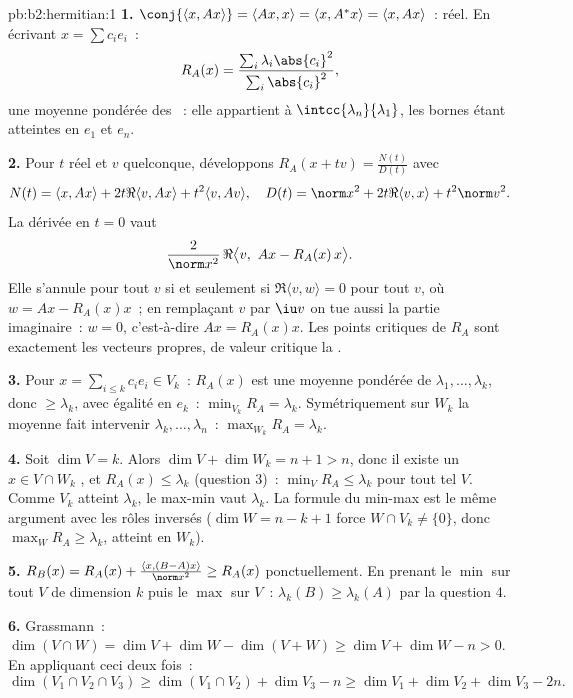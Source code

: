 \begin{solution}{pb:b2:hermitian:1}
\textbf{1.} $\conj{\langle x, Ax\rangle} = \langle Ax, x\rangle
= \langle x, A^*x\rangle = \langle x, Ax\rangle$~: réel. En écrivant
$x = \sum c_ie_i$~:
\[
R_A(x) = \frac{\sum_i\lambda_i\abs{c_i}^2}
{\sum_i\abs{c_i}^2} ,
\]
une moyenne pondérée des ~: elle appartient à
$\intcc{\lambda_n}{\lambda_1}$, les bornes étant atteintes en
$e_1$ et $e_n$.

\textbf{2.} Pour $t$ réel et $v$ quelconque, développons $R_A(x + tv) =
\frac{N(t)}{D(t)}$ avec
\[
N(t) = \langle x, Ax\rangle + 2t\Re\langle v, Ax\rangle +
t^2\langle v, Av\rangle,
\quad
D(t) = \norm x^2 + 2t\Re\langle v, x\rangle + t^2\norm v^2 .
\]
La dérivée en $t = 0$ vaut
\[
\frac{2}{\norm x^2}\,
\Re\bigl\langle v,\ Ax - R_A(x)\,x\bigr\rangle .
\]
Elle s'annule pour tout $v$ si et seulement si $\Re\langle v, w\rangle = 0$ pour
tout $v$, où $w = Ax - R_A(x)x$~; en remplaçant $v$ par $\iu v$
on tue aussi la partie imaginaire~: $w = 0$, c'est-à-dire $Ax = R_A(x)x$.
Les points critiques de $R_A$ sont exactement les vecteurs propres, de
valeur critique la .

\textbf{3.} Pour $x = \sum_{i\leq k}c_ie_i \in V_k$~: $R_A(x)$ est
une moyenne pondérée de $\lambda_1, \dots, \lambda_k$, donc
$\geq \lambda_k$, avec égalité en $e_k$~: $\min_{V_k} R_A =
\lambda_k$. Symétriquement sur $W_k$ la moyenne fait intervenir
$\lambda_k, \dots, \lambda_n$~: $\max_{W_k}R_A = \lambda_k$.

\textbf{4.} Soit $\dim V = k$. Alors $\dim V + \dim W_k = n + 1 >
n$, donc il existe un $x \in V \cap W_k$ , et $R_A(x) \leq
\lambda_k$ (question 3)~: $\min_{V}R_A \leq \lambda_k$ pour tout
tel $V$. Comme $V_k$ atteint $\lambda_k$, le max-min vaut
$\lambda_k$. La formule du min-max est le même argument avec les
rôles inversés ($\dim W = n - k + 1$ force $W \cap V_k \neq
\{0\}$, donc $\max_W R_A \geq \lambda_k$, atteint en $W_k$).

\textbf{5.} $R_B(x) = R_A(x) + \frac{\langle x,
(B-A)x\rangle}{\norm x^2} \geq R_A(x)$ ponctuellement. En prenant
le $\min$ sur tout $V$ de dimension $k$ puis le $\max$ sur $V$~:
$\lambda_k(B) \geq \lambda_k(A)$ par la question 4.

\textbf{6.} Grassmann~: $\dim(V\cap W) = \dim V + \dim W -
\dim(V + W) \geq \dim V + \dim W - n > 0$. En appliquant ceci deux fois~:
\[
\dim(V_1\cap V_2\cap V_3)
\geq \dim(V_1\cap V_2) + \dim V_3 - n
\geq \dim V_1 + \dim V_2 + \dim V_3 - 2n .
\]


\end{solution}

